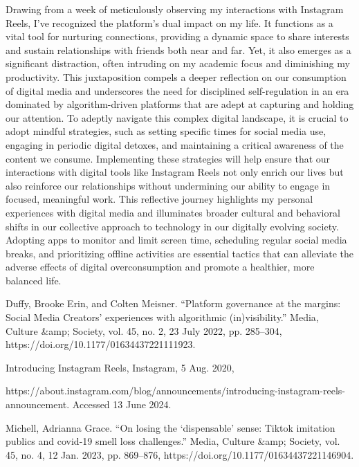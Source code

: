 \documentclass[12pt]{article}
\begin{document}
Drawing from a week of meticulously observing my interactions with Instagram Reels, I've recognized the platform's dual impact on my life. It functions as a vital tool for nurturing connections, providing a dynamic space to share interests and sustain relationships with friends both near and far. Yet, it also emerges as a significant distraction, often intruding on my academic focus and diminishing my productivity. This juxtaposition compels a deeper reflection on our consumption of digital media and underscores the need for disciplined self-regulation in an era dominated by algorithm-driven platforms that are adept at capturing and holding our attention. To adeptly navigate this complex digital landscape, it is crucial to adopt mindful strategies, such as setting specific times for social media use, engaging in periodic digital detoxes, and maintaining a critical awareness of the content we consume. Implementing these strategies will help ensure that our interactions with digital tools like Instagram Reels not only enrich our lives but also reinforce our relationships without undermining our ability to engage in focused, meaningful work. This reflective journey highlights my personal experiences with digital media and illuminates broader cultural and behavioral shifts in our collective approach to technology in our digitally evolving society. Adopting apps to monitor and limit screen time, scheduling regular social media breaks, and prioritizing offline activities are essential tactics that can alleviate the adverse effects of digital overconsumption and promote a healthier, more balanced life.

\printbibliography

\newpage
Duffy, Brooke Erin, and Colten Meisner. “Platform governance at the margins: Social Media Creators’ experiences with algorithmic (in)visibility.” Media, Culture \&amp; Society, vol. 45, no. 2, 23 July 2022, pp. 285–304, https://doi.org/10.1177/01634437221111923.

Introducing Instagram Reels, Instagram, 5 Aug. 2020,

https://about.instagram.com/blog/announcements/introducing-instagram-reels-announcement. Accessed 13 June 2024.

Michell, Adrianna Grace. “On losing the ‘dispensable’ sense: Tiktok imitation publics and covid-19 smell loss challenges.” Media, Culture \&amp; Society, vol. 45, no. 4, 12 Jan. 2023, pp. 869–876, https://doi.org/10.1177/01634437221146904. 
\end{document}
